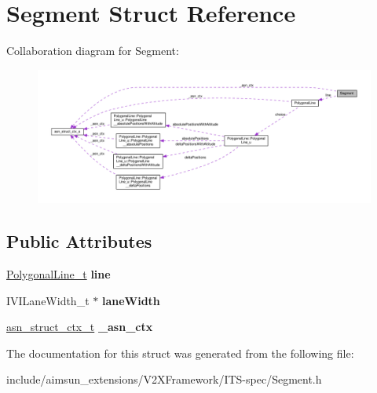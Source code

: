 \hypertarget{structSegment}{}\section{Segment Struct Reference}
\label{structSegment}


Collaboration diagram for Segment\+:\nopagebreak
\begin{figure}[H]
\begin{center}
\leavevmode
\includegraphics[width=350pt]{structSegment__coll__graph}
\end{center}
\end{figure}
\subsection*{Public Attributes}
\begin{DoxyCompactItemize}
\item 
\hyperlink{structPolygonalLine}{Polygonal\+Line\+\_\+t} {\bfseries line}\hypertarget{structSegment_a46baca34f625715b39fee580df09a6df}{}\label{structSegment_a46baca34f625715b39fee580df09a6df}

\item 
I\+V\+I\+Lane\+Width\+\_\+t $\ast$ {\bfseries lane\+Width}\hypertarget{structSegment_aabc65d078b7c8b302ac954b8f947a2ed}{}\label{structSegment_aabc65d078b7c8b302ac954b8f947a2ed}

\item 
\hyperlink{structasn__struct__ctx__s}{asn\+\_\+struct\+\_\+ctx\+\_\+t} {\bfseries \+\_\+asn\+\_\+ctx}\hypertarget{structSegment_a1d829962fae8ad359abd4d8e28db93cd}{}\label{structSegment_a1d829962fae8ad359abd4d8e28db93cd}

\end{DoxyCompactItemize}


The documentation for this struct was generated from the following file\+:\begin{DoxyCompactItemize}
\item 
include/aimsun\+\_\+extensions/\+V2\+X\+Framework/\+I\+T\+S-\/spec/Segment.\+h\end{DoxyCompactItemize}
